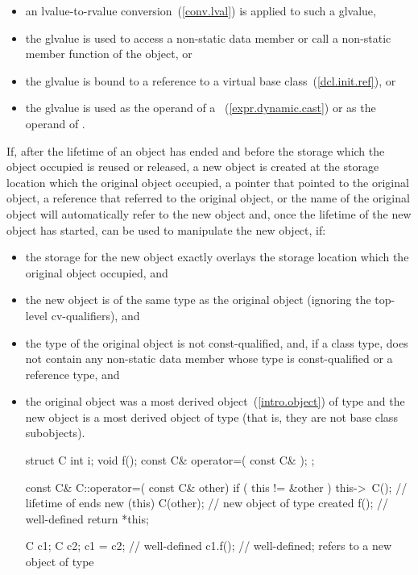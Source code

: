 \begin{itemize}
\item an lvalue-to-rvalue conversion~(\ref{conv.lval}) is applied to such a glvalue,

\item the glvalue is used to access a non-static data member or call a
non-static member function of the object, or

\item the glvalue is bound to a reference
to a virtual base class~(\ref{dcl.init.ref}), or

\item the glvalue is used as the operand of a
~(\ref{expr.dynamic.cast}) or as the operand of
.
\end{itemize}

\pnum
If, after the lifetime of an object has ended and before the storage
which the object occupied is reused or released, a new object is created
at the storage location which the original object occupied, a pointer
that pointed to the original object, a reference that referred to the
original object, or the name of the original object will automatically
refer to the new object and, once the lifetime of the new object has
started, can be used to manipulate the new object, if:

\begin{itemize}
\item the storage for the new object exactly overlays the storage
location which the original object occupied, and

\item the new object is of the same type as the original object
(ignoring the top-level cv-qualifiers), and

\item the type of the original object is not const-qualified, and, if a
class type, does not contain any non-static data member whose type is
const-qualified or a reference type, and

\item the original object was a most derived object~(\ref{intro.object})
of type  and the new object is a most derived object of type
 (that is, they are not base class subobjects). \enterexample

\begin{codeblock}
struct C {
  int i;
  void f();
  const C& operator=( const C& );
};

const C& C::operator=( const C& other) {
  if ( this != &other ) {
    this->~C();                 // lifetime of  ends
    new (this) C(other);        // new object of type  created
    f();                        // well-defined
  }
  return *this;
}

C c1;
C c2;
c1 = c2;                        // well-defined
c1.f();                         // well-defined;  refers to a new object of type 
\end{codeblock}

\exitexample
\end{itemize}

